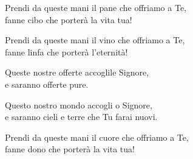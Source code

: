 

\spazio

\strofa Prendi da queste mani il pane che offriamo a Te,\\
fanne cibo che porterà la vita tua!

\spazio


\spazio

\strofa Prendi da queste mani il vino che offriamo a Te,\\
fanne linfa che porterà l'eternità!

\spazio

Queste nostre offerte accoglile Signore,\\
e saranno offerte pure.

\spazio

Questo nostro mondo accogli o Signore,\\
e saranno cieli e terre che Tu farai nuovi.

\spazio


\spazio

\strofa Prendi da queste mani il cuore che offriamo a Te,\\
fanne dono che porterà la vita tua!

\spazio

